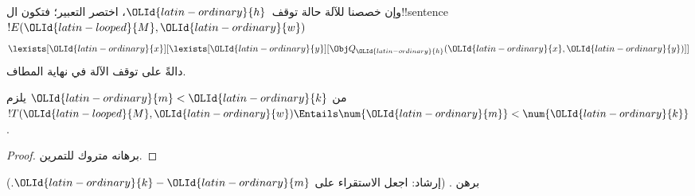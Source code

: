 \documentclass[../../../include/open-logic-section]{subfiles}
\begin{document}
وإن خصصنا للآلة حالة توقف~$\OLId{latin-ordinary}{h}$، اختصر التعبير؛ فتكون
ال!!{sentence}~$!E(\OLId{latin-looped}{M},\OLId{latin-ordinary}{w})$
\[
\lexists[\OLId{latin-ordinary}{x}][\lexists[\OLId{latin-ordinary}{y}][\Obj Q_\OLId{latin-ordinary}{h}(\OLId{latin-ordinary}{x}, \OLId{latin-ordinary}{y})]]
\]
دالةً على توقف الآلة في نهاية المطاف.

\begin{prop}
من $\OLId{latin-ordinary}{m}<\OLId{latin-ordinary}{k}$ يلزم $!T(\OLId{latin-looped}{M},\OLId{latin-ordinary}{w})\Entails\num{\OLId{latin-ordinary}{m}}<\num{\OLId{latin-ordinary}{k}}$.
\end{prop}

\begin{proof}
برهانه متروك للتمرين.
\end{proof}

\begin{prob}
برهن .
(إرشاد: اجعل الاستقراء على $\OLId{latin-ordinary}{k}-\OLId{latin-ordinary}{m}$.)
\end{prob}
\end{document}
